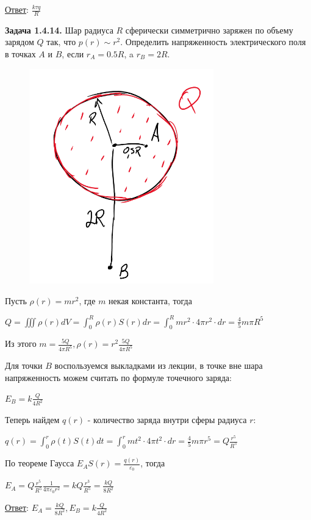 \underline{Ответ}: $\frac{k\tau q}{R}$

\clearpage

\begin{tcolorbox}
    \textbf{Задача 1.4.14.} Шар радиуса $R$ сферически симметрично
    заряжен по объему зарядом $Q$ так, что $p(r) \sim r^2$. Определить
    напряженность электрического поля в точках $A$ и $B$, если $r_A = 0.5R$,
    a $r_B=2R$.
\end{tcolorbox}


\begin{minipage}{\textwidth}
    \begin{figure}
        \includegraphics[width=8cm]{physics1/images/physics1_homework_6_4}
    \end{figure}

    Пусть $\rho(r) = mr^2$, где $m$ некая константа, тогда 

    $Q = \iiint \rho(r) dV = \int_0^R \rho(r) S(r) dr = \int_0^R mr^2 \cdot 4\pi r^2 \cdot dr = \frac{4}{5}m\pi R^5$

    Из этого $m = \frac{5Q}{4\pi R^5}, \rho(r) = r^2\frac{5Q}{4\pi R^5}$

    Для точки $B$ воспользуемся выкладками из лекции, в точке вне шара напряженность можем считать по формуле
    точечного заряда:

    $E_B = k\frac{Q}{4R^2}$

    Теперь найдем $q(r)$ - количество заряда внутри сферы радиуса $r$:

    $q(r) = \int_0^r \rho(t) S(t) dt = \int_0^r mt^2 \cdot 4\pi t^2 \cdot dr = \frac{4}{5}m\pi r^5 = Q\frac{r^5}{R^5}$

    По теореме Гаусса $E_A S(r) = \frac{q(r)}{\varepsilon_0}$, тогда 

    $E_A = Q\frac{r^5}{R^5} \frac{1}{4\pi\varepsilon_0 r^2} = kQ\frac{r^3}{R^5} = \frac{kQ}{8R^2}$

\end{minipage}

\underline{Ответ}: $E_A = \frac{kQ}{8R^2}, E_B = k\frac{Q}{4R^2}$


\clearpage
